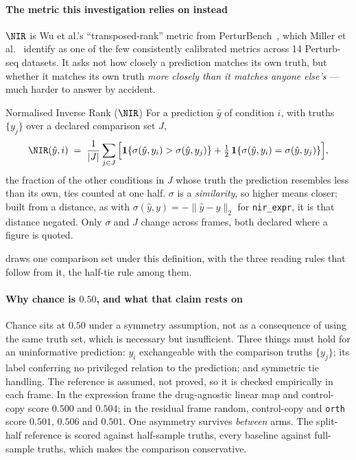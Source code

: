 \paragraph{The metric this investigation relies on instead} $\NIR$ is Wu
et al.'s ``transposed-rank'' metric from PerturBench~\cite{perturbench}, which
Miller et al.~\cite{miller} identify as one of the few consistently calibrated
metrics across 14 Perturb-seq datasets. It asks not how closely a prediction
matches its own truth, but whether it matches its own truth \emph{more closely
than it matches anyone else's} --- much harder to answer by accident.

\begin{defn}{Normalised Inverse Rank ($\NIR$)}
For a prediction $\hat y$ of condition $i$, with truths $\{y_j\}$ over a declared
comparison set $J$,
\begin{equation}
 \NIR(\hat{y}, i) \;=\; \frac{1}{|J|}\sum_{j \in J}
 \Big[\mathbf{1}\{\sigma(\hat{y}, y_i) > \sigma(\hat{y}, y_j)\}
 + \tfrac{1}{2}\,\mathbf{1}\{\sigma(\hat{y}, y_i) = \sigma(\hat{y}, y_j)\}\Big],
\end{equation}
the fraction of the other conditions in $J$ whose truth the prediction resembles
less than its own, ties counted at one half. $\sigma$ is a \emph{similarity}, so
higher means closer; built from a distance, as with
$\sigma(\hat y, y) = -\lVert \hat y - y \rVert_2$ for \texttt{nir\_expr}, it is
that distance negated. Only $\sigma$ and $J$ change across frames, both
declared where a figure is quoted.
\end{defn}

 draws one comparison set under this definition, with the three
reading rules that follow from it, the half-tie rule among them.



\paragraph{Why chance is $0.50$, and what that claim rests on} Chance sits at
$0.50$ under a symmetry assumption, not as a consequence of using the same truth
set, which is necessary but insufficient. Three things must hold for an
uninformative prediction: $y_i$ exchangeable with the comparison truths
$\{y_j\}$; its label conferring no privileged relation to the prediction; and
symmetric tie handling. The reference is assumed, not proved, so it is checked
empirically in each frame. In the expression frame the drug-agnostic linear map
and control-copy score $0.500$ and $0.504$; in the residual frame random,
control-copy and \texttt{orth} score $0.501$, $0.506$ and $0.501$. One asymmetry
survives \emph{between} arms. The split-half reference is scored against
half-sample truths, every baseline against full-sample
truths,
which makes the comparison conservative.

